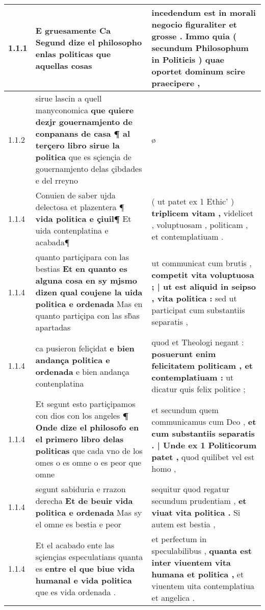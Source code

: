 \begin{tabular}{|p{1cm}|p{6.5cm}|p{6.5cm}|}

\hline
1.1.1 & E gruesamente \textbf{ Ca Segund dize el philosopho enlas politicas } que aquellas cosas & incedendum est in morali negocio figuraliter et grosse . \textbf{ Immo quia ( secundum Philosophum in Politicis ) } quae oportet dominum scire praecipere , \\\hline
1.1.2 & sirue lascin a quell manyconomica \textbf{ que quiere dezjr gouernamjento de conpanans de casa ¶ al terçero libro sirue la politica } que es sçiençia de gouernamjento delas çibdades e del rreyno & ø \\\hline
1.1.4 & Conuien de saber ujda delectosa et plazentera ¶ \textbf{ vida politica e çiuil¶ } Et uida contenplatina e acabada¶ & ( ut patet ex 1 Ethic’ ) \textbf{ triplicem vitam , } videlicet , voluptuosam , politicam , et contemplatiuam . \\\hline
1.1.4 & quanto partiçipara con las bestias \textbf{ Et en quanto es alguna cosa en sy mjsmo dizen qual coujene la uida politica e ordenada } Mas en quanto partiçipa con las sb̃as apartadas & ut communicat cum brutis , \textbf{ competit vita voluptuosa ; | ut est aliquid in seipso , vita politica : } sed ut participat cum substantiis separatis , \\\hline
1.1.4 & ca pusieron feliçidat \textbf{ e bien andança politica e ordenada } e bien andança contenplatina & quod et Theologi negant : \textbf{ posuerunt enim felicitatem politicam , et contemplatiuam : } ut dicatur quis felix politice ; \\\hline
1.1.4 & Et segunt esto partiçipamos con dios con los angeles \textbf{ ¶ Onde dize el philosofo en el primero libro delas politicas } que cada vno de los omes o es omne o es peor que omne & et secundum quem communicamus cum Deo , \textbf{ et cum substantiis separatis . | Unde ex 1 Politicorum patet , } quod quilibet vel est homo , \\\hline
1.1.4 & segunt sabiduria e rrazon derecha \textbf{ Et de beuir vida politica e ordenada } Mas sy el omne es bestia e peor & sequitur quod regatur secundum prudentiam , \textbf{ et viuat vita politica . } Si autem est bestia , \\\hline
1.1.4 & Et el acabado ente las sçiençias especulatians quanta es \textbf{ entre el que biue vida humanal e vida politica } que es vida ordenada . & et perfectum in speculabilibus , \textbf{ quanta est inter viuentem vita humana et politica , } et viuentem uita contemplatiua et angelica . \\\hline

\end{tabular}
